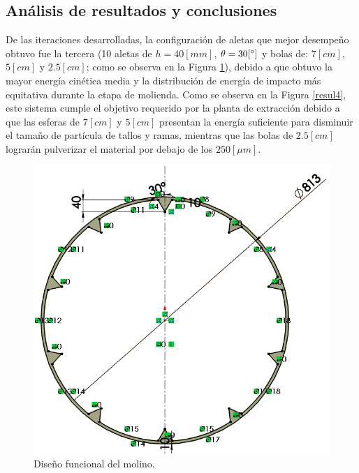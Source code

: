 \newpage

\begin{center}
	\section{An\'alisis de resultados y conclusiones}
\end{center}

\noindent
\justify

De las iteraciones desarrolladas, la configuraci\'on de aletas que mejor desempe\~no obtuvo fue la tercera (10 aletas de $h=40 [mm]$, $\theta = 30 [\degree ]$ y bolas de: $7[cm]$, $5[cm]$ y $2.5[cm]$; como se observa en la Figura \ref{sol}), debido a que obtuvo la mayor energ\'ia cin\'etica media y la distribuci\'on de energ\'ia de impacto m\'as equitativa durante la etapa de molienda. Como se observa en la Figura \ref{resul4}, este sistema cumple el objetivo requerido por la planta de extracci\'on debido a que las esferas de $7 [cm]$ y $5 [cm]$ presentan la energ\'ia suficiente para disminuir el tama\~no de part\'icula de tallos y ramas, mientras que las bolas de $2.5 [cm]$ lograr\'an pulverizar el material por debajo de los $250 [\mu m]$.

\begin{figure}[h!]
\centering
\includegraphics[width=\textwidth]{Images/Resultados/res.PNG}
\caption{Dise\~no funcional del molino.}
\label{sol}
\end{figure}
